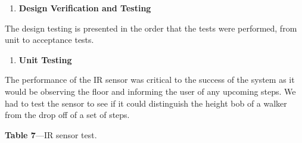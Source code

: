 \begin{enumerate}
\def\labelenumi{\arabic{enumi}.}
\setcounter{enumi}{2}
\item
  \textbf{Design Verification and Testing}
\end{enumerate}

The design testing is presented in the order that the tests were
performed, from unit to acceptance tests.

\begin{enumerate}
\def\labelenumi{\arabic{enumi}.}
\item
  \textbf{Unit Testing}
\end{enumerate}

The performance of the IR sensor was critical to the success of the
system as it would be observing the floor and informing the user of any
upcoming steps. We had to test the sensor to see if it could distinguish
the height bob of a walker from the drop off of a set of steps.

\textbf{Table 7}---IR sensor test.

